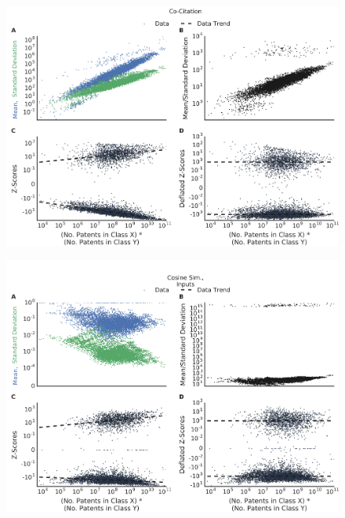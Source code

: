 \documentclass[]{svjour3}
\begin{document}
\begin{figure}[p]
\begin{center}
\includegraphics[width=\textwidth]{figs/Z_Score_Inflation_Co-Citation_IPC.png} 
\end{center}
\caption{}
\end{figure}

\begin{figure}[]
\begin{center}
\includegraphics[width=\textwidth]{figs/Z_Score_Inflation_Cosine_Sim_Inputs_IPC.png} 
\end{center}
\caption{}
\end{figure}
\end{document}
